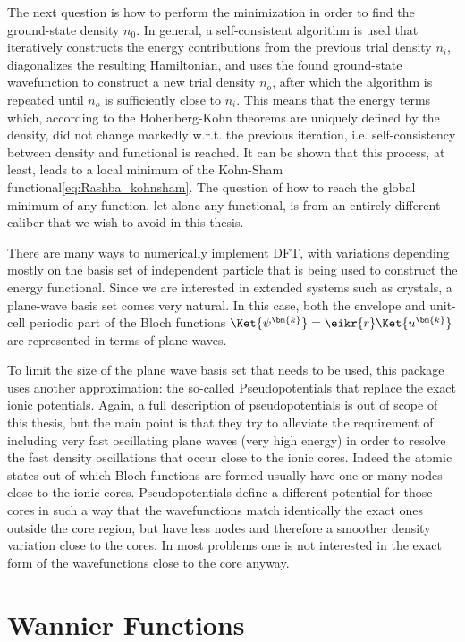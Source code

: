 The next question is how to perform the minimization in order to find the ground-state density $n_0$.
In general, a self-consistent algorithm is used that iteratively constructs the energy contributions from the previous trial density $n_i$, diagonalizes the resulting Hamiltonian, and uses the found ground-state wavefunction to construct a new trial density $n_o$, after which the algorithm is repeated until $n_o$ is sufficiently close to $n_i$.
This means that the energy terms which, according to the Hohenberg-Kohn theorems are uniquely defined by the density, did not change markedly w.r.t. the previous iteration, i.e. self-consistency between density and functional is reached.
It can be shown that this process, at least, leads to a local minimum of the Kohn-Sham functional\ref{eq:Rashba_kohnsham}.
The question of how to reach the global minimum of any function, let alone any functional, is from an entirely different caliber that we wish to avoid in this thesis. 

There are many ways to numerically implement DFT, with variations depending mostly on the basis set of independent particle that is being used to construct the energy functional.
Since we are interested in extended systems such as crystals, a plane-wave basis set comes very natural.
In this case, both the envelope and unit-cell periodic part of the Bloch functions $\Ket{\psi^{\bm{k}}} = \eikr{r} \Ket{u^{\bm{k}}}$ are represented in terms of plane waves.

To limit the size of the plane wave basis set that needs to be used, this package uses another approximation: the so-called Pseudopotentials that replace the exact ionic potentials.
Again, a full description of pseudopotentials is out of scope of this thesis, but the main point is that they try to alleviate the requirement of including very fast oscillating plane waves (very high energy) in order to resolve the fast density oscillations that occur close to the ionic cores.
Indeed the atomic states out of which Bloch functions are formed usually have one or many nodes close to the ionic cores.
Pseudopotentials define a different potential for those cores in such a way that the wavefunctions match identically the exact ones outside the core region, but have less nodes and therefore a smoother density variation close to the cores.
In most problems one is not interested in the exact form of the wavefunctions close to the core anyway.

\section{Wannier Functions \label{sec:Wannier}}


